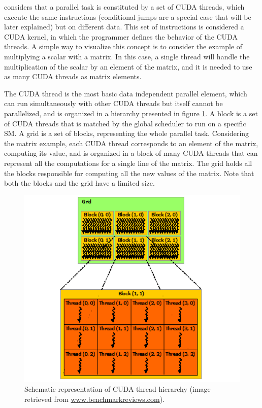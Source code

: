 \nvidia considers that a parallel task is constituted by a set of CUDA threads, which execute the same instructions (conditional jumps are a special case that will be later explained) but on different data. This set of instructions is considered a CUDA kernel, in which the programmer defines the behavior of the CUDA threads. A simple way to visualize this concept is to consider the example of multiplying a scalar with a matrix. In this case, a single thread will handle the multiplication of the scalar by an element of the matrix, and it is needed to use as many CUDA threads as matrix elements.

The CUDA thread is the most basic data independent parallel element, which can run simultaneously with other CUDA threads but itself cannot be parallelized, and is organized in a hierarchy presented in figure \ref{fig:CUDAHierarchy}. A block is a set of CUDA threads that is matched by the global scheduler to run on a specific SM. A grid is a set of blocks, representing the whole parallel task. Considering the matrix example, each CUDA thread corresponds to an element of the matrix, computing its value, and is organized in a block of many CUDA threads that can represent all the computations for a single line of the matrix. The grid holds all the blocks responsible for computing all the new values of the matrix. Note that both the blocks and the grid have a limited size.

\begin{figure}[!htp]
	\begin{center}
		\includegraphics[scale=0.9]{../../common/img/cuda_hierarchy.png}
		\caption{Schematic representation of CUDA thread hierarchy (image retrieved from \url{www.benchmarkreviews.com}).}
		\label{fig:CUDAHierarchy}
	\end{center}
\end{figure}


